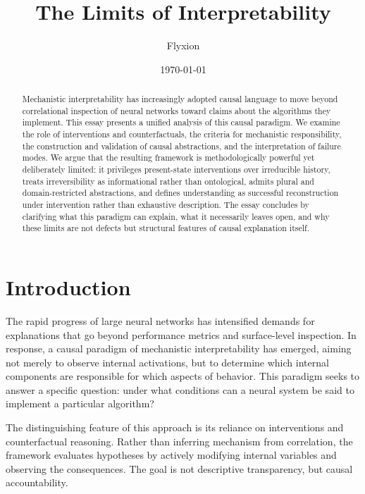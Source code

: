 \documentclass[11pt]{article}
\title{The Limits of Interpretability}
\author{Flyxion}
\date{\today}
\begin{document}
\maketitle

\begin{abstract}
Mechanistic interpretability has increasingly adopted causal language to move beyond correlational inspection of neural networks toward claims about the algorithms they implement. This essay presents a unified analysis of this causal paradigm. We examine the role of interventions and counterfactuals, the criteria for mechanistic responsibility, the construction and validation of causal abstractions, and the interpretation of failure modes. We argue that the resulting framework is methodologically powerful yet deliberately limited: it privileges present-state interventions over irreducible history, treats irreversibility as informational rather than ontological, admits plural and domain-restricted abstractions, and defines understanding as successful reconstruction under intervention rather than exhaustive description. The essay concludes by clarifying what this paradigm can explain, what it necessarily leaves open, and why these limits are not defects but structural features of causal explanation itself.
\end{abstract}

\section{Introduction}

The rapid progress of large neural networks has intensified demands for explanations that go beyond performance metrics and surface-level inspection. In response, a causal paradigm of mechanistic interpretability has emerged, aiming not merely to observe internal activations, but to determine which internal components are responsible for which aspects of behavior. This paradigm seeks to answer a specific question: under what conditions can a neural system be said to implement a particular algorithm?

The distinguishing feature of this approach is its reliance on interventions and counterfactual reasoning. Rather than inferring mechanism from correlation, the framework evaluates hypotheses by actively modifying internal variables and observing the consequences. The goal is not descriptive transparency, but causal accountability.
\end{document}
